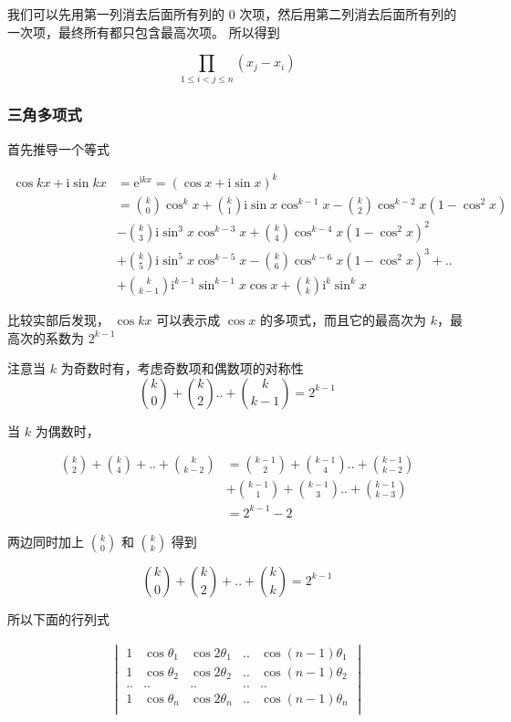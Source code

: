 \documentclass[12pt,a4paper]{ctexart}
\begin{document}
我们可以先用第一列消去后面所有列的 0 次项，然后用第二列消去后面所有列的一次项，最终所有都只包含最高次项。
所以得到

\[
\prod_{1 \le i < j \le n}(x_j -x_i)
\]

\subsubsection{三角多项式}

首先推导一个等式

\begin{align*}
    \cos{kx} + \text{i} \sin kx &= \text{e} ^{\text{i} kx} = \left( \cos x + \text{i} \sin x \right)^k \\
    &= \binom{k}{0}\cos^k x + \binom{k}{1}\text{i} \sin x \cos^{k-1} x - \binom{k}{2}\cos^{k-2} x (1- \cos^2 x)  \\
    & - \binom{k}{3}\text{i} \sin^3 x \cos^{k-3} x + \binom{k}{4}\cos^{k-4} x (1- \cos^2 x)^2  \\
    & + \binom{k}{5}\text{i} \sin^5 x \cos^{k-5} x  - \binom{k}{6}\cos^{k-6} x (1- \cos^2 x)^3 + .. \\
    & + \binom{k}{k-1}\text{i}^{k-1} \sin^{k-1} x \cos x + \binom{k}{k}\text{i}^k \sin^k x
\end{align*}


比较实部后发现， $\cos kx$ 可以表示成 $\cos x$ 的多项式，而且它的最高次为 $k$，最高次的系数为 $2^{k-1}$

注意当 $k$ 为奇数时有，考虑奇数项和偶数项的对称性
\[
    \binom{k}{0} + \binom{k}{2} .. + \binom{k}{k-1} = 2^{k-1}
\]

当 $k$ 为偶数时，

\begin{align*}
\binom{k}{2} + \binom{k}{4} + .. + \binom{k}{k-2} &= \binom{k-1}{2} + \binom{k-1}{4} .. + \binom{k-1}{k-2} \\
& + \binom{k-1}{1} + \binom{k-1}{3} .. + \binom{k-1}{k-3} \\
&= 2^{k-1} - 2
\end{align*}

两边同时加上 $\binom{k}{0}$ 和 $\binom{k}{k}$ 得到

\[
\binom{k}{0} + \binom{k}{2} + .. + \binom{k}{k} = 2^{k-1}
\]

所以下面的行列式

\begin{align*}
    \begin{vmatrix}
        1 & \cos \theta_1 & \cos 2\theta_1 & .. & \cos(n-1)\theta_1 \\
        1 & \cos \theta_2 & \cos 2\theta_2 & .. & \cos(n-1)\theta_2 \\
        .. & .. &.. &.. &.. \\
        1 & \cos \theta_n & \cos 2\theta_n & .. & \cos(n-1)\theta_n \\
    \end{vmatrix}
\end{align*}
\end{document}
